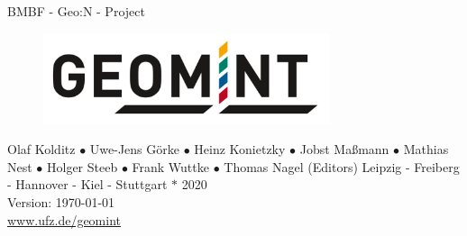 
\begin{center}

\quad
\vspace{2cm}
\quad

\Huge
BMBF - Geo:N - Project
\\[3cm]
\begin{figure}[htbp]
\centering
\includegraphics[width=0.75\textwidth]{figures/geomint-logo}
\end{figure}
\vspace{2cm}
\Large
Olaf Kolditz $\bullet$ Uwe-Jens G\"orke $\bullet$ Heinz Konietzky $\bullet$ Jobst Ma{\ss}mann $\bullet$ Mathias Nest $\bullet$ Holger Steeb $\bullet$ Frank Wuttke $\bullet$ Thomas Nagel (Editors)
\vfill
\Large
Leipzig - Freiberg - Hannover - Kiel - Stuttgart $\ast$ 2020
\\[1ex]
Version: \today
\\[1ex]
\url{www.ufz.de/geomint}
\end{center}
\normalsize
